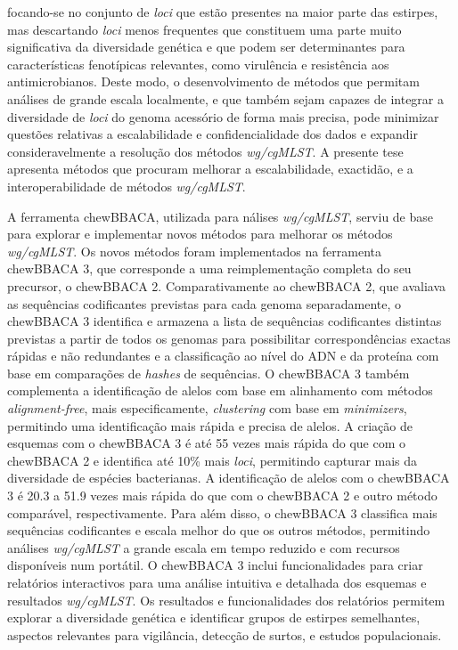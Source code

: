focando-se no conjunto de \textit{loci} que estão presentes na maior parte das estirpes, mas descartando \textit{loci} menos frequentes que constituem uma parte muito significativa da diversidade genética e que podem ser determinantes para características fenotípicas relevantes, como virulência e resistência aos antimicrobianos. Deste modo, o desenvolvimento de métodos que permitam análises de grande escala localmente, e que também sejam capazes de integrar a diversidade de \textit{loci} do genoma acessório de forma mais precisa, pode minimizar questões relativas a escalabilidade e confidencialidade dos dados e expandir consideravelmente a resolução dos métodos \textit{wg/cgMLST}. A presente tese apresenta métodos que procuram melhorar a escalabilidade, exactidão, e a interoperabilidade de métodos \textit{wg/cgMLST}.

A ferramenta chewBBACA, utilizada para nálises \textit{wg/cgMLST}, serviu de base para explorar e implementar novos métodos para melhorar os métodos \textit{wg/cgMLST}. Os novos métodos foram implementados na ferramenta chewBBACA 3, que corresponde a uma reimplementação completa do seu precursor, o chewBBACA 2. Comparativamente ao chewBBACA 2, que avaliava as sequências codificantes previstas para cada genoma separadamente, o chewBBACA 3 identifica e armazena a lista de sequências codificantes distintas previstas a partir de todos os genomas para possibilitar correspondências exactas rápidas e não redundantes e a classificação ao nível do ADN e da proteína com base em comparações de \textit{hashes} de sequências. O chewBBACA 3 também complementa a identificação de alelos com base em alinhamento com métodos \textit{alignment-free}, mais especificamente, \textit{clustering} com base em \textit{minimizers}, permitindo uma identificação mais rápida e precisa de alelos. A criação de esquemas com o chewBBACA 3 é até 55 vezes mais rápida do que com o chewBBACA 2 e identifica até 10\% mais \textit{loci}, permitindo capturar mais da diversidade de espécies bacterianas. A identificação de alelos com o chewBBACA 3 é 20.3 a 51.9 vezes mais rápida do que com o chewBBACA 2 e outro método comparável, respectivamente. Para além disso, o chewBBACA 3 classifica mais sequências codificantes e escala melhor do que os outros métodos, permitindo análises \textit{wg/cgMLST} a grande escala em tempo reduzido e com recursos disponíveis num portátil. O chewBBACA 3 inclui funcionalidades para criar relatórios interactivos para uma análise intuitiva e detalhada dos esquemas e resultados \textit{wg/cgMLST}. Os resultados e funcionalidades dos relatórios permitem explorar a diversidade genética e identificar grupos de estirpes semelhantes, aspectos relevantes para vigilância, detecção de surtos, e estudos populacionais.

